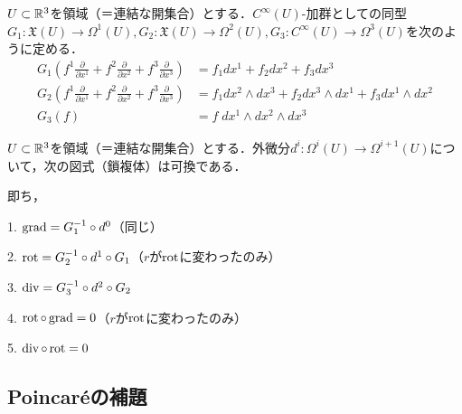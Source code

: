 \documentclass[uplatex, dvipdfmx]{jsreport}
\begin{document}
\begin{definition}[３次元の場合]
    $U\subset\mathbb{R}^3$を領域（＝連結な開集合）とする．$C^\infty(U)$-加群としての同型$G_1:\mathfrak{X}(U)\to\Omega^1(U), G_2:\mathfrak{X}(U)\to\Omega^2(U), G_3:C^\infty(U)\to\Omega^3(U)$を次のように定める．
    \begin{align*}
        G_1(f^1\frac{\partial}{\partial x^1}+f^2\frac{\partial}{\partial x^2}+f^3\frac{\partial}{\partial x^3}) &= f_1dx^1+f_2dx^2+f_3dx^3 \\
        G_2(f^1\frac{\partial}{\partial x^1}+f^2\frac{\partial}{\partial x^2}+f^3\frac{\partial}{\partial x^3}) &= f_1dx^2\wedge dx^3 + f_2 dx^3\wedge dx^1+f_3dx^1\wedge dx^2 \\
        G_3(f) &= f\;dx^1\wedge dx^2\wedge dx^3
    \end{align*}
\end{definition}
\begin{proposition}[$\grad,\rot,\divergence$]
    $U\subset\mathbb{R}^3$を領域（＝連結な開集合）とする．外微分$d^i:\Omega^i(U)\to\Omega^{i+1}(U)$について，次の図式（鎖複体）は可換である．
    \begin{center}
    \end{center}
    即ち，

    1. $\operatorname{\mathrm{grad}} = G^{-1}_1\circ d^0$（同じ）

    2. $\operatorname{\mathrm{rot}}=G^{-1}_2\circ d^1\circ G_1$（$r$が$\operatorname{\mathrm{rot}}$に変わったのみ）

    3. $\operatorname{\mathrm{div}}=G^{-1}_3\circ d^2\circ G_2$

    4. $\operatorname{\mathrm{rot}}\circ\operatorname{\mathrm{grad}}=0$（$r$が$\operatorname{\mathrm{rot}}$に変わったのみ）

    5. $\operatorname{\mathrm{div}}\circ\operatorname{\mathrm{rot}}=0$
\end{proposition}

\subsection{Poincaréの補題}
\end{document}
